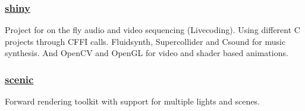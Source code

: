 \documentclass[11pt]{article}
\begin{document}
\subsubsection{\href {https://github.com/azimut/shiny} {shiny}}
Project for on the fly audio and video sequencing (Livecoding). Using different C projects through CFFI calls. Fluidsynth, Supercollider and Csound for music synthesis. And OpenCV and OpenGL for video and shader based animations.
\subsubsection{\href {https://github.com/azimut/scenic} {scenic}}
Forward rendering toolkit with support for multiple lights and scenes.
\end{document}
